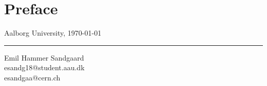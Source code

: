 \chapter*{Preface}












\vspace{\baselineskip}\hfill Aalborg University, \today
\vfill\noindent



\vspace{3\baselineskip}
\begin{center}
\begin{minipage}[b]{0.45\textwidth}
 \centering
 \rule{\textwidth}{0.5pt}
  Emil Hammer Sandgaard\\
 {\footnotesize esandg18@student.aau.dk}\\
 {\footnotesize esandgaa@cern.ch}
\end{minipage}
\end{center}
